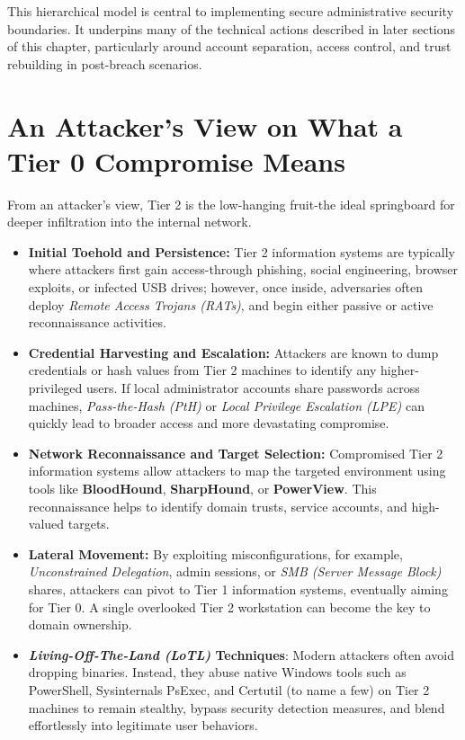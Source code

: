 This hierarchical model is central to implementing secure administrative security boundaries. It underpins many of the technical actions described in later sections of this chapter, particularly around account separation, access control, and trust rebuilding in post-breach scenarios.

\section{An Attacker's View on What a Tier 0 Compromise Means}
From an attacker's view, Tier 2 is the low-hanging fruit-the ideal springboard for deeper infiltration into the internal network.

\begin{itemize}
    \item \textbf{Initial Toehold and Persistence:} Tier 2 information systems are typically where attackers first gain access-through phishing, social engineering, browser exploits, or infected USB drives; however, once inside, adversaries often deploy \textit{Remote Access Trojans (RATs)}, and begin either passive or active reconnaissance activities.
    \item \textbf{Credential Harvesting and Escalation:} Attackers are known to dump credentials or hash values from Tier 2 machines to identify any higher-privileged users. If local administrator accounts share passwords across machines, \textit{Pass-the-Hash (PtH)} or \textit{Local Privilege Escalation (LPE)} can quickly lead to broader access and more devastating compromise.
    \item \textbf{Network Reconnaissance and Target Selection:} Compromised Tier 2 information systems allow attackers to map the targeted environment using tools like \textbf{BloodHound}, \textbf{SharpHound}, or \textbf{PowerView}. This reconnaissance helps to identify domain trusts, service accounts, and high-valued targets.
    \item \textbf{Lateral Movement:} By exploiting misconfigurations, for example, \textit{Unconstrained Delegation}, admin sessions, or \textit{SMB (Server Message Block)} shares, attackers can pivot to Tier 1 information systems, eventually aiming for Tier 0. A single overlooked Tier 2 workstation can become the key to domain ownership.
    \item \textbf{\textit{Living-Off-The-Land (LoTL)} Techniques}: Modern attackers often avoid dropping binaries. Instead, they abuse native Windows tools such as PowerShell, Sysinternals PsExec, and Certutil (to name a few) on Tier 2 machines to remain stealthy, bypass security detection measures, and blend effortlessly into legitimate user behaviors.


\end{itemize}
